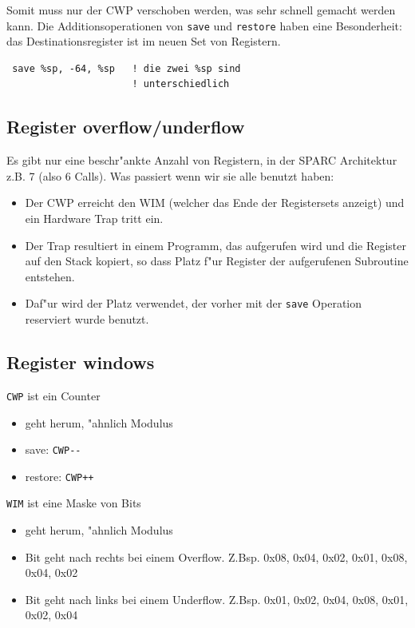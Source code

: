 \documentclass[german, 10pt, a4paper, twocolumn]{scrartcl}
\begin{document}
Somit muss nur der CWP verschoben werden, was sehr schnell gemacht werden kann. Die Additionsoperationen von \verb#save# und \verb#restore# haben eine Besonderheit: das Destinationsregister ist im neuen Set von Registern.
\begin{verbatim}
 save %sp, -64, %sp   ! die zwei %sp sind
                      ! unterschiedlich
\end{verbatim}

\subsection{Register overflow/underflow}

Es gibt nur eine beschr"ankte Anzahl von Registern, in der SPARC Architektur z.B. 7 (also 6 Calls). Was passiert wenn wir sie alle benutzt haben:
\begin{itemize}
 \item Der CWP erreicht den WIM (welcher das Ende der Registersets anzeigt) und ein Hardware Trap tritt ein.
 \item Der Trap resultiert in einem Programm, das aufgerufen wird und die Register auf den Stack kopiert, so dass Platz f"ur Register der aufgerufenen Subroutine entstehen.
 \item Daf"ur wird der Platz verwendet, der vorher mit der \verb#save# Operation reserviert wurde benutzt.
\end{itemize}

\subsection{Register windows}

\texttt{CWP} ist ein Counter
\begin{itemize}
	\item geht herum, "ahnlich Modulus
	\item save: \verb#CWP--#
	\item restore: \verb#CWP++#
\end{itemize}

\texttt{WIM} ist eine Maske von Bits
\begin{itemize}
	\item geht herum, "ahnlich Modulus
	\item Bit geht nach rechts bei einem Overflow. Z.Bsp. 0x08, 0x04, 0x02, 0x01, 0x08, 0x04, 0x02
	\item Bit geht nach links bei einem Underflow. Z.Bsp. 0x01, 0x02, 0x04, 0x08, 0x01, 0x02, 0x04
\end{itemize}
\end{document}
